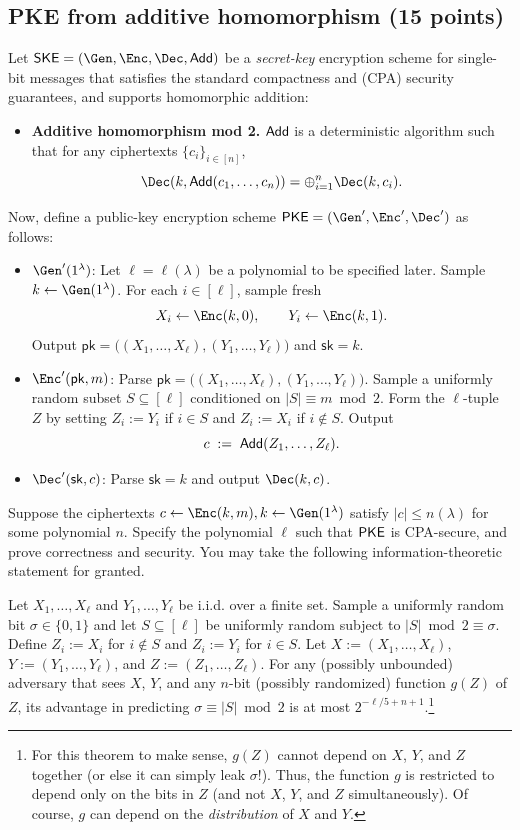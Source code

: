 \documentclass{article}
\newcommand{\pk}{\mathsf{pk}}
\newcommand{\sk}{\mathsf{sk}}
\begin{document}
\subsection{PKE from additive homomorphism (15 points)}
Let $\SKE = (\Gen, \Enc, \Dec, \Add)$ be a \emph{secret-key} encryption scheme for single-bit messages that satisfies the standard compactness and (CPA) security guarantees, and supports homomorphic addition:
\begin{itemize}
  \item \textbf{Additive homomorphism mod 2.} $\mathsf{Add}$ is a deterministic algorithm such that for any ciphertexts $\{c_i\}_{i \in [n]}$, 
    \[ \Dec(k, \Add(c_1, \ldots, c_n)) = \oplus_{i=1}^n \Dec(k, c_i). \]
\end{itemize}
Now, define a public-key encryption scheme $\PKE =(\Gen', \Enc', \Dec')$ as follows:
\begin{itemize}
  \item $\Gen'(1^\lambda)$: Let $\ell = \ell(\lambda)$ be a polynomial to be specified later. Sample $k \leftarrow \Gen(1^\lambda)$. For each $i \in [\ell]$, sample fresh
    \[ X_i \gets \Enc(k, 0), \qquad Y_i \gets \Enc(k, 1). \]
  Output $\pk = \big((X_1, \dots, X_\ell), (Y_1, \dots, Y_\ell)\big)$ and $\sk = k$.
  \item $\Enc'(\pk, m)$: Parse $\pk = \big((X_1, \dots, X_\ell), (Y_1, \dots, Y_\ell)\big)$. Sample a uniformly random subset $S \subseteq [\ell]$ conditioned on $|S| \equiv m \bmod{2}$. Form the $\ell$-tuple $Z$ by setting $Z_i := Y_i$ if $i \in S$ and $Z_i := X_i$ if $i \notin S$. Output
    \[ c \;:=\; \mathsf{Add}(Z_1, \dots, Z_\ell). \]
  \item $\Dec'(\sk, c)$: Parse $\sk = k$ and output $\Dec(k, c)$.
\end{itemize}
Suppose the ciphertexts $c \gets \Enc(k, m), k \gets \Gen(1^\lambda)$ satisfy $|c| \le n(\lambda)$ for some polynomial $n$. Specify the polynomial $\ell$ such that $\mathsf{PKE}$ is CPA-secure, and prove correctness and security. You may take the following information-theoretic statement for granted.
\begin{theorem}\label{thm:it}
    Let $X_1, \dots, X_\ell$ and $Y_1, \dots, Y_\ell$ be i.i.d. over a finite set. Sample a uniformly random bit $\sigma \in \{0, 1\}$ and let $S \subseteq [\ell]$ be uniformly random subject to $|S| \bmod 2 \equiv \sigma$. Define $Z_i := X_i$ for $i \notin S$ and $Z_i:=Y_i$ for $i \in S$. Let $X := (X_1, \dots, X_\ell)$, $Y := (Y_1, \dots, Y_\ell)$, and $Z := (Z_1, \ldots, Z_\ell)$. For any (possibly unbounded) adversary that sees $X$, $Y$, and any $n$-bit (possibly randomized) function $g(Z)$ of $Z$, its advantage in predicting $\sigma \equiv |S| \bmod 2$ is at most $2^{-\ell/5 + n + 1}$.\footnote{For this theorem to make sense, $g(Z)$ cannot depend on $X$, $Y$, and $Z$ together (or else it can simply leak $\sigma$!). Thus, the function $g$ is restricted to depend only on the bits in $Z$ (and not $X$, $Y$, and $Z$ simultaneously). Of course, $g$ can depend on the \emph{distribution} of $X$ and $Y$.}
\end{theorem}
\end{document}
